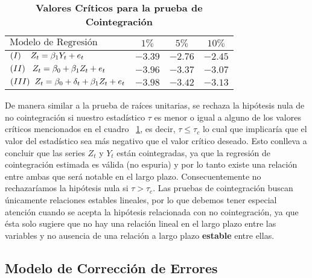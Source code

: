 \begin{table}[ht]
\caption{\textbf{Valores Críticos para la prueba de Cointegración}}
\label{table:CVC}
\centering
   \begin{tabular}{lccc}
    \firsthline
    $\mbox{Modelo de Regresión}$                                               &  $1\%$    &  $5\%$    & $10\%$   \\
   \hline
    $(I) \hspace{4mm}Z_t =\beta_1 Y_{t} + e_t$                     		&  $-3.39$ 	&	 $-2.76$ 	& 	$-2.45$ \\
    $(II) \hspace{3mm}Z_t = \beta_0 + \beta_1Z_{t} + e_t$            	&  $-3.96$ 	& 	$-3.37$ 	& 	$-3.07$ \\
    $(III)\hspace{2mm} Z_t = \beta_0 + \delta_t + \beta_1Z_{t}  + e_t$ 	& $-3.98$ 	& 	$-3.42$ 	&	 $-3.13$ \\
    \hline
    \end{tabular}
\end{table}
 
 \bigskip


De manera similar a la prueba de raíces unitarias, se rechaza la hipótesis nula de no cointegración si nuestro estadístico $\tau$ es menor 
o igual a alguno de los valores críticos mencionados en el cuadro ~\ref{table:CVC}, es decir, $\tau \leq \tau_c$ lo cual que implicaría que el valor del estadístico sea más negativo que el valor crítico deseado. Esto conlleva a concluir que las series $Z_t$ y $Y_t$ están cointegradas, ya que la regresión de cointegración estimada es válida (no espuria) y por lo tanto existe una relación entre ambas que será notable en el largo plazo.  Consecuentemente no rechazaríamos la hipótesis nula si $\tau > \tau_c$. Las pruebas de cointegración buscan únicamente relaciones estables lineales, por lo que debemos tener especial atención cuando se acepta la hipótesis relacionada con no cointegración, ya que ésta solo sugiere que no hay una relación lineal en el largo plazo entre las variables y no ausencia de una relación a largo plazo \textbf{estable} entre ellas.\bigskip


\subsection{Modelo de Corrección de Errores}



